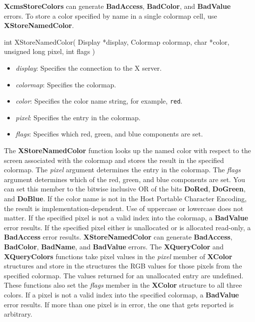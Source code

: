 \documentclass{report}
\begin{document}
\begin{itemize}
            \bigbreak \noindent
            \textbf{XcmsStoreColors} can generate \textbf{BadAccess}, \textbf{BadColor}, and \textbf{BadValue} errors.
            \bigbreak \noindent
            To store a color specified by name in a single colormap cell, use \textbf{XStoreNamedColor}.
            \bigbreak \noindent 
            \begin{cppcode}
                int XStoreNamedColor(
                    Display *display,
                    Colormap colormap,
                    char *color,
                    unsigned long pixel,
                    int flags
                )
            \end{cppcode}
            \bigbreak \noindent
            \begin{itemize}
                \item \textit{display}: Specifies the connection to the X server.
                \item \textit{colormap}: Specifies the colormap.
                \item \textit{color}: Specifies the color name string, for example, \texttt{red}.
                \item \textit{pixel}: Specifies the entry in the colormap.
                \item \textit{flags}: Specifies which red, green, and blue components are set.
            \end{itemize}
            \noindent
            The \textbf{XStoreNamedColor} function looks up the named color with respect to the screen associated with the colormap and stores the result in the specified colormap. The \textit{pixel} argument determines the entry in the colormap. The \textit{flags} argument determines which of the red, green, and blue components are set. You can set this member to the bitwise inclusive OR of the bits \textbf{DoRed}, \textbf{DoGreen}, and \textbf{DoBlue}.
            \bigbreak \noindent
            If the color name is not in the Host Portable Character Encoding, the result is implementation-dependent. Use of uppercase or lowercase does not matter. If the specified pixel is not a valid index into the colormap, a \textbf{BadValue} error results. If the specified pixel either is unallocated or is allocated read-only, a \textbf{BadAccess} error results.
            \bigbreak \noindent
            \textbf{XStoreNamedColor} can generate \textbf{BadAccess}, \textbf{BadColor}, \textbf{BadName}, and \textbf{BadValue} errors.
            \bigbreak \noindent
            The \textbf{XQueryColor} and \textbf{XQueryColors} functions take pixel values in the \textit{pixel} member of \textbf{XColor} structures and store in the structures the RGB values for those pixels from the specified colormap. The values returned for an unallocated entry are undefined. These functions also set the \textit{flags} member in the \textbf{XColor} structure to all three colors. If a pixel is not a valid index into the specified colormap, a \textbf{BadValue} error results. If more than one pixel is in error, the one that gets reported is arbitrary.

\end{itemize}
\end{document}
